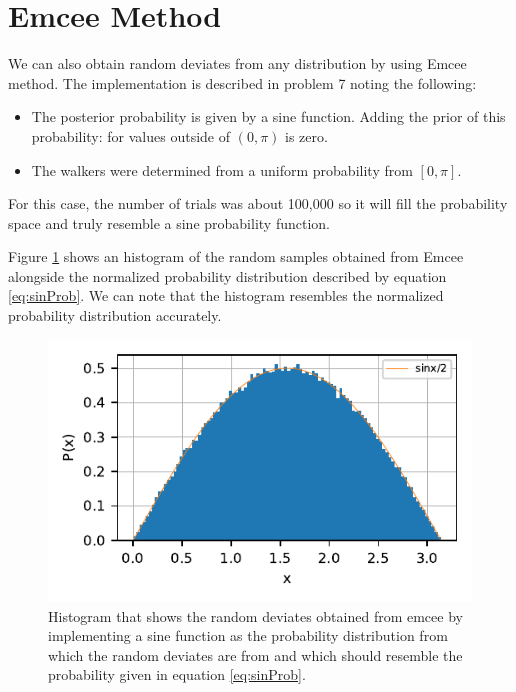 \section{Emcee Method}

We can also obtain random deviates from any distribution by using Emcee method. The implementation is described in problem 7 noting the following:
\begin{itemize}
    \item The posterior probability is given by a sine function. Adding the prior of this probability: for values outside of $(0,\pi)$ is zero.
    \item The walkers were determined from a uniform probability from $[0,\pi]$.
\end{itemize}

For this case, the number of trials was about 100,000 so it will fill the probability space and truly resemble a sine probability function. 

Figure \ref{fig:emceeRandPlot} shows an histogram of the random samples obtained from Emcee alongside the normalized probability distribution described by equation \ref{eq:sinProb}. We can note that the histogram resembles the normalized probability distribution accurately.
 

\begin{figure}
    \centering
    \includegraphics{CodeAndFigures/emceeRandomDeviatesPlot.pdf}
    \caption{Histogram that shows the random deviates obtained from emcee by implementing a sine function as the probability distribution from which the random deviates are from and which should resemble the probability given in equation \ref{eq:sinProb}.}
    \label{fig:emceeRandPlot}
\end{figure}